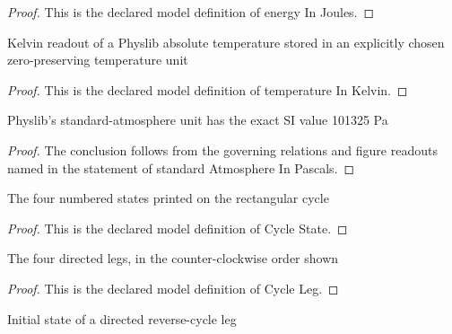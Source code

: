 \begin{proof}
  This is the declared model definition of energy In Joules.
\end{proof}
\begin{definition}
  \label{def:physics:phyx-mini-0435:phyxminiproblems-problemphyxmini0435-temperatureinkelvin}
  Kelvin readout of a Physlib absolute temperature stored in an explicitly chosen zero-preserving temperature unit
\end{definition}
\begin{proof}
  This is the declared model definition of temperature In Kelvin.
\end{proof}
\begin{lemma}
  \label{lem:physics:phyx-mini-0435:phyxminiproblems-problemphyxmini0435-standardatmosphereinpascals}
  Physlib's standard-atmosphere unit has the exact SI value 101325 Pa
\end{lemma}
\begin{proof}
  The conclusion follows from the governing relations and figure readouts named in the statement of standard Atmosphere In Pascals.
\end{proof}
\begin{definition}
  \label{def:physics:phyx-mini-0435:phyxminiproblems-problemphyxmini0435-cyclestate}
  The four numbered states printed on the rectangular cycle
\end{definition}
\begin{proof}
  This is the declared model definition of Cycle State.
\end{proof}
\begin{definition}
  \label{def:physics:phyx-mini-0435:phyxminiproblems-problemphyxmini0435-cycleleg}
  The four directed legs, in the counter-clockwise order shown
\end{definition}
\begin{proof}
  This is the declared model definition of Cycle Leg.
\end{proof}
\begin{definition}
  \label{def:physics:phyx-mini-0435:phyxminiproblems-problemphyxmini0435-legsource}
  Initial state of a directed reverse-cycle leg
\end{definition}
